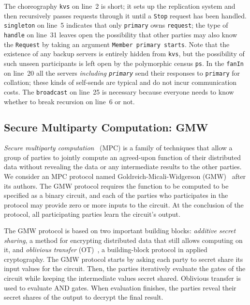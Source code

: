 \documentclass[sigplan,screen]{acmart}
\newcommand{\inlinecode}[2][haskell]{\texttt{#2}}
\begin{document}
The choreography \inlinecode{kvs} on line~2 is short;
it sets up the replication system and then recursively passes requests through it
until a \inlinecode{Stop} request has been handled.
\inlinecode{singleton} on line~5 indicates that
only \inlinecode{primary} owns \inlinecode{request};
the type of \inlinecode{handle} on line~31 leaves open the possibility
that other parties may also know the \inlinecode{Request} by taking an argument
\inlinecode{Member primary starts}.
Note that the existence of any backup servers is entirely hidden from \inlinecode{kvs},
but the possibility of such unseen participants is left open
by the polymorphic census \inlinecode{ps}.
In the \inlinecode{fanIn} on line~20
all the servers \emph{including \inlinecode{primary}} send their responses
to \inlinecode{primary} for collation;
these kinds of self-sends are typical and do not incur communication costs.
The \inlinecode{broadcast} on line~25 is necessary because everyone needs to know
whether to break recursion on line~6 or not.


\subsection{Secure Multiparty Computation: GMW}\label{sec:gmw}

\emph{Secure multiparty computation}~\cite{evans2018pragmatic} (MPC) is a family of techniques that allow a group of parties to jointly compute an agreed-upon function of their distributed data without revealing the data or any intermediate results to the other parties. We consider an MPC protocol named Goldreich-Micali-Widgerson (GMW)~\cite{goldreich2019play} after its authors. The GMW protocol requires the function to be computed to be specified as a binary circuit, and each of the parties who participates in the protocol may provide zero or more inputs to the circuit. At the conclusion of the protocol, all participating parties learn the circuit's output.

The GMW protocol is based on two important building blocks: \emph{additive secret sharing}, a method for encrypting distributed data that still allows computing on it, and \emph{oblivious transfer} (OT)~\cite{naor2001efficient}, a building-block protocol in applied cryptography. The GMW protocol starts by asking each party to secret share its input values for the circuit. Then, the parties iteratively evaluate the gates of the circuit while keeping the intermediate values secret shared. Oblivious transfer is used to evaluate AND gates. When evaluation finishes, the parties reveal their secret shares of the output to decrypt the final result.
\end{document}

